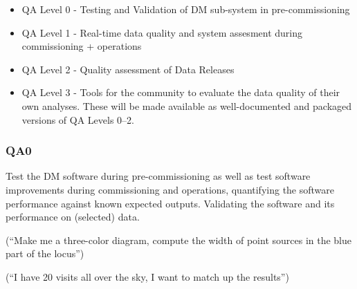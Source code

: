 \begin{itemize}
\item QA Level 0 - Testing and Validation of DM sub-system in pre-commissioning
\item QA Level 1 - Real-time data quality and system assesment during commissioning + operations
\item QA Level 2 - Quality assessment of Data Releases
\item QA Level 3 - Tools for the community to evaluate the data quality of their own analyses.
  These will be made available as well-documented and packaged versions of QA Levels 0--2.
\end{itemize}

\subsubsection{QA0}

Test the DM software during pre-commissioning as well as test software improvements during commissioning and operations, quantifying the software performance against known expected outputs.
Validating the software and its performance on (selected) data.

(“Make me a three-color diagram, compute the width of point sources in the blue part of the locus”)

(“I have 20 visits all over the sky, I want to match up the results”)

